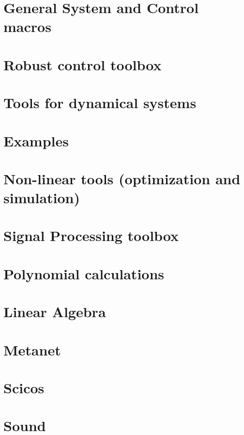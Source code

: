 \section{General System and Control macros}
         
\section{Robust control toolbox}
         
\section{Tools for dynamical systems}
        
\section{Examples}
        
\section{Non-linear tools (optimization and simulation) }
        
\section{Signal Processing toolbox}
        
\section{Polynomial calculations}
        
\section{Linear Algebra}
        
\section{Metanet}
        
\section{Scicos} 
        
\section{Sound}
        
